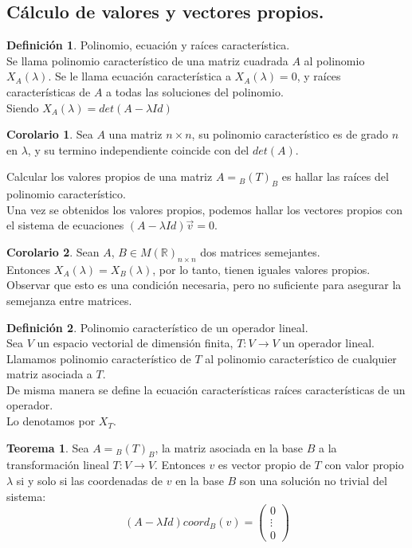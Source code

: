 \documentclass[10pt]{article}
\theoremstyle{definition}
\newtheorem{definition}{Definición}[section]
\newtheorem{theorem}{Teorema}[section]
\newtheorem{corollary}{Corolario}[theorem]
\begin{document}
\subsection{Cálculo de valores y vectores propios.}
\begin{definition}{Polinomio, ecuación y raíces característica.}
	\\Se llama polinomio característico de una matriz cuadrada $A$ al polinomio $X_A\left( \lambda \right) $. Se le llama ecuación característica a $X_A(\lambda)=0$, y raíces características de $A$ a todas las soluciones del polinomio.
	\\Siendo $X_A(\lambda)=det(A-\lambda Id)$
\end{definition}
\begin{corollary}
	Sea $A$ una matriz $n\times n$, su polinomio característico es de grado $n$ en $\lambda$, y su termino independiente coincide con del $det(A)$.
\end{corollary}
Calcular los valores propios de una matriz $A={}_B(T)_B$ es hallar las raíces del polinomio característico.
\\Una vez se obtenidos los valores propios, podemos hallar los vectores propios con el sistema de ecuaciones $\left( A-\lambda Id \right)\vec{v}=0 $.
\begin{corollary}
	Sean $A$, $B\in M\left( \mathbb{R} \right)_{n\times n}$ dos matrices semejantes.
	\\Entonces $X_A(\lambda)=X_B(\lambda)$, por lo tanto, tienen iguales valores propios.\\
	Observar que esto es una condición necesaria, pero no suficiente para asegurar la semejanza entre matrices.
\end{corollary}
\begin{definition}{Polinomio característico de un operador lineal.}
	\\Sea $V$ un espacio vectorial de dimensión finita, $T:V\to V$ un operador lineal. Llamamos polinomio característico de $T$ al polinomio característico de cualquier matriz asociada a $T$.\\
	De misma manera se define la ecuación características raíces características de un operador.\\
	Lo denotamos por $X_T$.
\end{definition}
\begin{theorem}
	Sea $A={}_B(T)_B$, la matriz asociada en la base $B$ a la transformación lineal $T:V\to V$. Entonces $v$ es vector propio de $T$ con valor propio $\lambda$ si y solo si las coordenadas de $v$ en la base $B$ son una solución no trivial del sistema: $$\left( A-\lambda Id \right) coord_B\left( v \right) =\begin{pmatrix} 0 \\ \vdots \\ 0 \end{pmatrix}  $$
\end{theorem}
\end{document}

